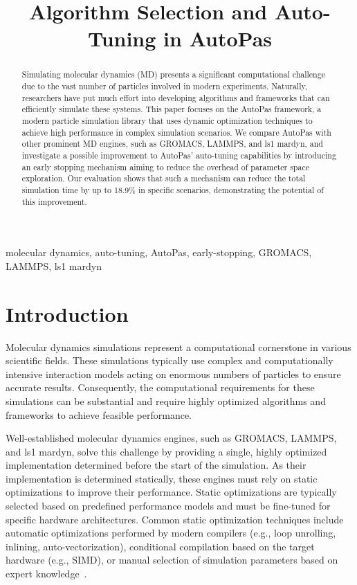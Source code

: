 \documentclass[conference]{IEEEtran}
\begin{document}
\title{Algorithm Selection and Auto-Tuning in AutoPas}

\author{
}

\maketitle

\begin{abstract}
    Simulating molecular dynamics (MD) presents a significant computational challenge due to the vast number of particles involved in modern experiments. Naturally, researchers have put much effort into developing algorithms and frameworks that can efficiently simulate these systems. This paper focuses on the AutoPas framework, a modern particle simulation library that uses dynamic optimization techniques to achieve high performance in complex simulation scenarios. We compare AutoPas with other prominent MD engines, such as GROMACS, LAMMPS, and ls1 mardyn, and investigate a possible improvement to AutoPas' auto-tuning capabilities by introducing an early stopping mechanism aiming to reduce the overhead of parameter space exploration. Our evaluation shows that such a mechanism can reduce the total simulation time by up to 18.9\% in specific scenarios, demonstrating the potential of this improvement.
\end{abstract}

\begin{IEEEkeywords}
    molecular dynamics, auto-tuning, AutoPas, early-stopping, GROMACS, LAMMPS, ls1 mardyn
\end{IEEEkeywords}

\section{Introduction}

Molecular dynamics simulations represent a computational cornerstone in various scientific fields. These simulations typically use complex and computationally intensive interaction models acting on enormous numbers of particles to ensure accurate results. Consequently, the computational requirements for these simulations can be substantial and require highly optimized algorithms and frameworks to achieve feasible performance.

Well-established molecular dynamics engines, such as GROMACS, LAMMPS, and ls1 mardyn, solve this challenge by providing a single, highly optimized implementation determined before the start of the simulation. As their implementation is determined statically, these engines must rely on static optimizations to improve their performance. Static optimizations are typically selected based on predefined performance models and must be fine-tuned for specific hardware architectures. Common static optimization techniques include automatic optimizations performed by modern compilers (e.g., loop unrolling, inlining, auto-vectorization), conditional compilation based on the target hardware (e.g., SIMD), or manual selection of simulation parameters based on expert knowledge~\cite{Gratl2019AutoPas}.
\end{document}
